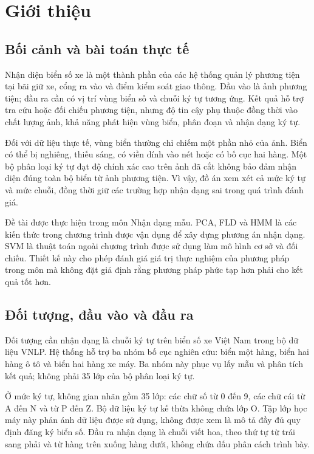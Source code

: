 \chapter{Giới thiệu}
\section{Bối cảnh và bài toán thực tế}
Nhận diện biển số xe là một thành phần của các hệ thống quản lý phương tiện tại bãi giữ xe, cổng ra vào và điểm kiểm soát giao thông. Đầu vào là ảnh phương tiện; đầu ra cần có vị trí vùng biển số và chuỗi ký tự tương ứng. Kết quả hỗ trợ tra cứu hoặc đối chiếu phương tiện, nhưng độ tin cậy phụ thuộc đồng thời vào chất lượng ảnh, khả năng phát hiện vùng biển, phân đoạn và nhận dạng ký tự.

Đối với dữ liệu thực tế, vùng biển thường chỉ chiếm một phần nhỏ của ảnh. Biển có thể bị nghiêng, thiếu sáng, có viền dính vào nét hoặc có bố cục hai hàng. Một bộ phân loại ký tự đạt độ chính xác cao trên ảnh đã cắt không bảo đảm nhận diện đúng toàn bộ biển từ ảnh phương tiện. Vì vậy, đồ án xem xét cả mức ký tự và mức chuỗi, đồng thời giữ các trường hợp nhận dạng sai trong quá trình đánh giá.

Đề tài được thực hiện trong môn Nhận dạng mẫu. PCA, FLD và HMM là các kiến thức trong chương trình được vận dụng để xây dựng phương án nhận dạng. SVM là thuật toán ngoài chương trình được sử dụng làm mô hình cơ sở và đối chiếu. Thiết kế này cho phép đánh giá giá trị thực nghiệm của phương pháp trong môn mà không đặt giả định rằng phương pháp phức tạp hơn phải cho kết quả tốt hơn.

\section{Đối tượng, đầu vào và đầu ra}
Đối tượng cần nhận dạng là chuỗi ký tự trên biển số xe Việt Nam trong bộ dữ liệu VNLP. Hệ thống hỗ trợ ba nhóm bố cục nghiên cứu: biển một hàng, biển hai hàng ô tô và biển hai hàng xe máy. Ba nhóm này phục vụ lấy mẫu và phân tích kết quả; không phải 35 lớp của bộ phân loại ký tự.

Ở mức ký tự, không gian nhãn gồm 35 lớp: các chữ số từ 0 đến 9, các chữ cái từ A đến N và từ P đến Z. Bộ dữ liệu ký tự kế thừa không chứa lớp O. Tập lớp học máy này phản ánh dữ liệu được sử dụng, không được xem là mô tả đầy đủ quy định đăng ký biển số. Đầu ra nhận dạng là chuỗi viết hoa, theo thứ tự từ trái sang phải và từ hàng trên xuống hàng dưới, không chứa dấu phân cách trình bày.

